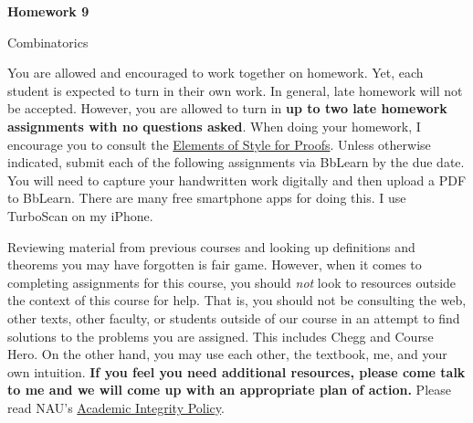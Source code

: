 \documentclass[11pt]{article}%
\theoremstyle{definition}
\newcommand{\blankline}{\pagebreak[2]\vspace{.5\baselineskip}}
\begin{document}
\begin{center}
{\Large\bf Homework 9}

\smallskip

Combinatorics
\end{center}

\thispagestyle{fancy}

You are allowed and encouraged to work together on homework. Yet, each student is expected to turn in their own work. In general, late homework will not be accepted. However, you are allowed to turn in \textbf{up to two late homework assignments with no questions asked}. When doing your homework, I encourage you to consult the \href{http://danaernst.com/teaching/ElementsOfStyle.pdf}{Elements of Style for Proofs}. Unless otherwise indicated, submit each of the following assignments via BbLearn by the due date. You will need to capture your handwritten work digitally and then upload a PDF to BbLearn. There are many free smartphone apps for doing this. I use TurboScan on my iPhone.

\blankline

Reviewing material from previous courses and looking up definitions and theorems you may have forgotten is fair game. However, when it comes to completing assignments for this course, you should \emph{not} look to resources outside the context of this course for help.  That is, you should not be consulting the web, other texts, other faculty, or students outside of our course in an attempt to find solutions to the problems you are assigned.  This includes Chegg and Course Hero. On the other hand, you may use each other, the textbook, me, and your own intuition. \textbf{If you feel you need additional resources, please come talk to me and we will come up with an appropriate plan of action.} Please read NAU's \href{https://www5.nau.edu/policies/Client/Details/828?whoIsLooking=Students&pertainsTo=All&sortDirection=Ascending&page=1}{Academic Integrity Policy}.

\blankline
\end{document}
